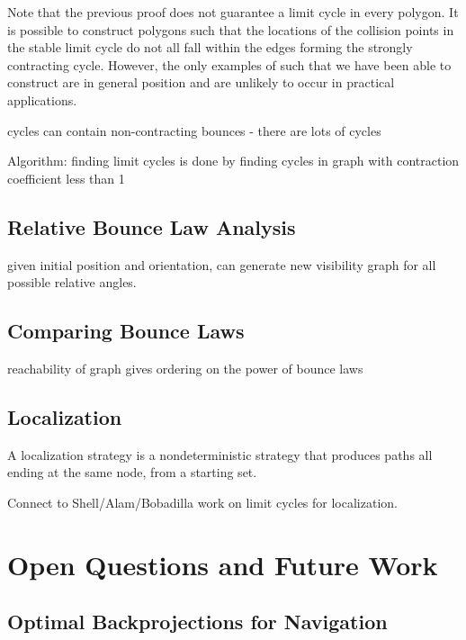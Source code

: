 \documentclass[]{styles/svproc}  %
\begin{document}
Note that the previous proof does not guarantee a limit cycle in every polygon.
It is possible to construct polygons such that the locations of the collision
points in the stable limit cycle do not all fall within the edges forming the
strongly contracting cycle. However, the only examples of such that we have been
able to construct are in general position and are unlikely to occur in practical
applications.

\begin{lemma}
cycles can contain non-contracting bounces - there are lots of cycles
\end{lemma}

Algorithm: finding limit cycles is done by finding cycles in graph with
contraction coefficient less than 1

\subsection{Relative Bounce Law Analysis}

given initial position and orientation, can generate new visibility graph for
all possible relative angles.

\subsection{Comparing Bounce Laws}

\begin{theorem}
reachability of graph gives ordering on the power of bounce laws
\end{theorem}

\subsection{Localization}

\begin{definition}
A localization strategy is a nondeterministic strategy that produces paths all
ending at the same node, from a starting set.
\end{definition}

Connect to Shell/Alam/Bobadilla work on limit cycles for localization.



\section{Open Questions and Future Work}

\subsection{Optimal Backprojections for Navigation}
\end{document}
